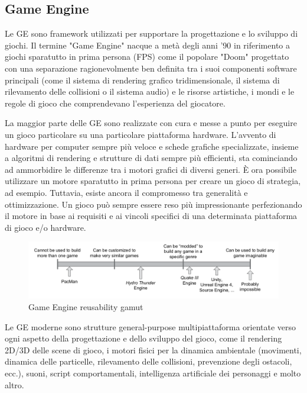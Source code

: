 \subsection{Game Engine}
Le GE sono framework utilizzati per supportare la progettazione e lo sviluppo di giochi. Il termine "Game Engine" nacque a metà degli anni '90 in riferimento a giochi sparatutto in prima persona (FPS) come il popolare "Doom" progettato con una separazione ragionevolmente ben definita tra i suoi componenti software principali (come il sistema di rendering grafico tridimensionale, il sistema di rilevamento delle collisioni o il sistema audio) e le risorse artistiche, i mondi e le regole di gioco che comprendevano l'esperienza del giocatore.

\medskip

La maggior parte delle GE sono realizzate con cura e messe a punto per eseguire un gioco particolare su una particolare piattaforma hardware.
L'avvento di hardware per computer sempre più veloce e schede grafiche specializzate, insieme a algoritmi di rendering e strutture di dati sempre più efficienti, sta cominciando ad ammorbidire le differenze tra i motori grafici di diversi generi. È ora possibile utilizzare un motore sparatutto in prima persona per creare un gioco di strategia, ad esempio. Tuttavia, esiste ancora il compromesso tra generalità e ottimizzazione. Un gioco può sempre essere reso più impressionante perfezionando il motore in base ai requisiti e ai vincoli specifici di una determinata piattaforma di gioco e/o hardware.\cite{ge-architecture}

\begin{figure}[H]
\centering
\includegraphics[width=\textwidth]{figures/Game_Engine_Reusability.png}
\caption{Game Engine reusability gamut \cite{ge-architecture}}
\end{figure}
\medskip

Le GE moderne sono strutture general-purpose multipiattaforma orientate verso ogni aspetto della progettazione e dello sviluppo del gioco, come il rendering 2D/3D delle scene di gioco, i motori fisici per la dinamica ambientale (movimenti, dinamica delle particelle, rilevamento delle collisioni, prevenzione degli ostacoli, ecc.), suoni, script comportamentali, intelligenza artificiale dei personaggi e molto altro.

